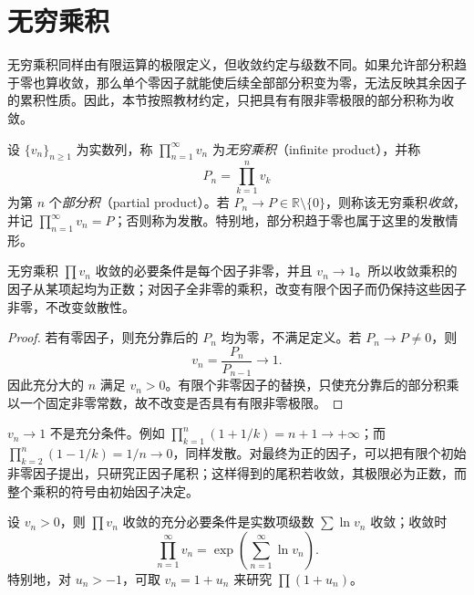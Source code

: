 \section{无穷乘积}
\label{sec:infinite-products}

无穷乘积同样由有限运算的极限定义，但收敛约定与级数不同。如果允许部分积趋于零也算收敛，那么单个零因子就能使后续全部部分积变为零，无法反映其余因子的累积性质。因此，本节按照教材约定，只把具有有限非零极限的部分积称为收敛。

\begin{definition}
设 $\{v_n\}_{n\geq1}$ 为实数列，称 $\prod_{n=1}^{\infty}v_n$ 为\emph{无穷乘积}（infinite product），并称
\[
    P_n=\prod_{k=1}^n v_k
\]
为第 $n$ 个\emph{部分积}（partial product）。若 $P_n\to P\in\mathbb R\setminus\{0\}$，则称该无穷乘积\emph{收敛}，并记 $\prod_{n=1}^{\infty}v_n=P$；否则称为发散。特别地，部分积趋于零也属于这里的发散情形。
\end{definition}

\begin{proposition}
\label{prop:infinite-product-necessary-condition}
无穷乘积 $\prod v_n$ 收敛的必要条件是每个因子非零，并且 $v_n\to1$。所以收敛乘积的因子从某项起均为正数；对因子全非零的乘积，改变有限个因子而仍保持这些因子非零，不改变敛散性。
\end{proposition}

\begin{proof}
若有零因子，则充分靠后的 $P_n$ 均为零，不满足定义。若 $P_n\to P\neq0$，则
\[
    v_n=\frac{P_n}{P_{n-1}}\longrightarrow1.
\]
因此充分大的 $n$ 满足 $v_n>0$。有限个非零因子的替换，只使充分靠后的部分积乘以一个固定非零常数，故不改变是否具有有限非零极限。
\end{proof}

$v_n\to1$ 不是充分条件。例如
$\prod_{k=1}^n(1+1/k)=n+1\to+\infty$；而 $\prod_{k=2}^n(1-1/k)=1/n\to0$，同样发散。对最终为正的因子，可以把有限个初始非零因子提出，只研究正因子尾积；这样得到的尾积若收敛，其极限必为正数，而整个乘积的符号由初始因子决定。

\begin{theorem}[无穷乘积的对数判据]
\label{thm:infinite-product-logarithmic-criterion}
设 $v_n>0$，则 $\prod v_n$ 收敛的充分必要条件是实数项级数 $\sum\ln v_n$ 收敛；收敛时
\begin{equation}
    \prod_{n=1}^{\infty}v_n
      =\exp\left(\sum_{n=1}^{\infty}\ln v_n\right).
    \label{eq:infinite-product-logarithm}
\end{equation}
特别地，对 $u_n>-1$，可取 $v_n=1+u_n$ 来研究 $\prod(1+u_n)$。
\end{theorem}

